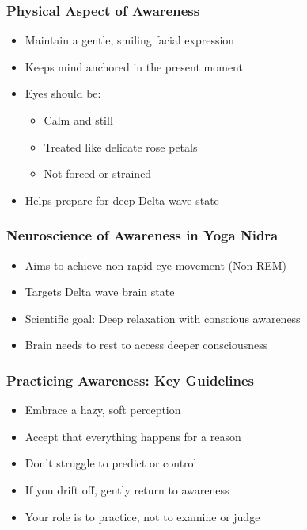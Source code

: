 \begin{frame}[fragile]\frametitle{Physical Aspect of Awareness}
    \begin{itemize}
        \item Maintain a gentle, smiling facial expression
        \item Keeps mind anchored in the present moment
        \item Eyes should be:
            \begin{itemize}
                \item Calm and still
                \item Treated like delicate rose petals
                \item Not forced or strained
            \end{itemize}
        \item Helps prepare for deep Delta wave state
    \end{itemize}
\end{frame}

\begin{frame}[fragile]\frametitle{Neuroscience of Awareness in Yoga Nidra}
    \begin{itemize}
        \item Aims to achieve non-rapid eye movement (Non-REM)
        \item Targets Delta wave brain state
        \item Scientific goal: Deep relaxation with conscious awareness
        \item Brain needs to rest to access deeper consciousness
    \end{itemize}
\end{frame}

\begin{frame}[fragile]\frametitle{Practicing Awareness: Key Guidelines}
    \begin{itemize}
        \item Embrace a hazy, soft perception
        \item Accept that everything happens for a reason
        \item Don't struggle to predict or control
        \item If you drift off, gently return to awareness
        \item Your role is to practice, not to examine or judge
    \end{itemize}
\end{frame}

